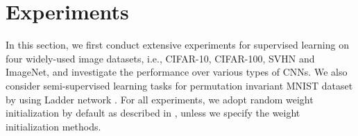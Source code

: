 \documentclass[twocolumn]{article}
\newcommand{\TODO}[1]{\textcolor{red}{TODO: }\textcolor{red}{\emph{#1}}}
\begin{document}
\section{Experiments}
%
In this section, we first conduct extensive experiments for supervised learning on four widely-used image datasets, i.e., CIFAR-10, CIFAR-100, SVHN and ImageNet, and investigate the performance over various types of CNNs. We also consider semi-supervised learning tasks for permutation invariant MNIST dataset by using Ladder network \cite{2015_NIPS_Rasmus}. For all experiments, we adopt random weight initialization by default as described in \cite{1998_NN_Yann}, unless we specify the weight initialization methods.
\end{document}
